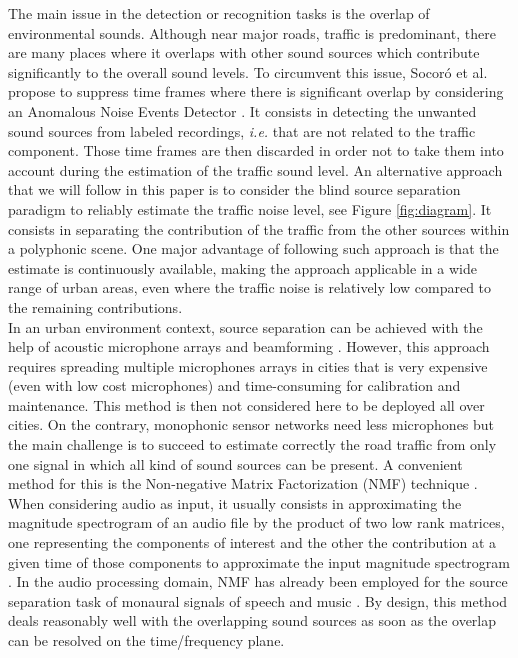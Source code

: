 \documentclass[twocolumn]{svjour3}          %
\begin{document}
The main issue in the detection or recognition tasks is the overlap of environmental sounds. Although near major roads, traffic is predominant, there are many places where it overlaps with other sound sources which contribute significantly to the overall sound levels. To circumvent this issue, Socor\'o et al. propose to suppress time frames where there is significant overlap by considering an Anomalous Noise Events Detector \cite{socoro_anomalous_2017}. It consists in detecting the unwanted sound sources from labeled recordings, \textit{i.e.} that are not related to the traffic component. Those time frames are then discarded in order not to take them into account during the estimation of the traffic sound level.
An alternative approach that we will follow in this paper is to consider the blind source separation paradigm to reliably estimate the traffic noise level, see Figure \ref{fig:diagram}. It consists in separating the contribution of the traffic from the other sources within a polyphonic scene. One major advantage of following such approach is that the estimate is continuously available, making the approach applicable in a wide range of urban areas, even where the traffic noise is relatively low compared to the remaining contributions.\\

In an urban environment context, source separation can be achieved with the help of acoustic microphone arrays and beamforming \cite{saruwatari2003blind}. However, this approach requires spreading multiple microphones arrays in cities that is very expensive (even with low cost microphones) and time-consuming for calibration and maintenance. This method is then not considered here to be deployed all over cities. On the contrary, monophonic sensor networks need less microphones but the main challenge is to succeed to estimate correctly the road traffic from only one signal in which all kind of sound sources can be present. A convenient method for this is the  Non-negative Matrix Factorization (NMF) technique \cite{lee_learning_1999}. When considering audio as input, it usually consists in approximating the magnitude spectrogram of an audio file by the product of two low rank matrices, one representing the components of interest and the other the contribution at a given time of those components to approximate the input magnitude spectrogram \cite{smaragdis_non-negative_2003} \cite{wilson_speech_2008}. In the audio processing domain, NMF has already been employed for the source separation task of monaural signals of speech and music \cite{wang_musical_2005} \cite{wilson_speech_2008}. By design, this method deals reasonably well with the overlapping sound sources as soon as the overlap can be resolved on the time/frequency plane.
\end{document}
